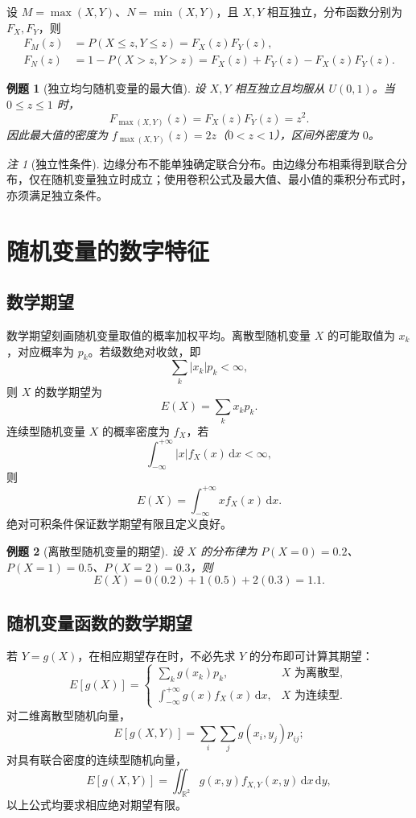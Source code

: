 \documentclass[11pt,a4paper,fontset=fandol]{ctexart}
\newtheorem{example}{例题}[section]
\theoremstyle{remark}
\newtheorem{remark}{注}[section]
\begin{document}
设 $M=\max(X,Y)$、$N=\min(X,Y)$，且 $X,Y$ 相互独立，分布函数分别为 $F_X,F_Y$，则
\[
\begin{aligned}
    F_M(z)
    &=P(X\leq z,Y\leq z)
      =F_X(z)F_Y(z),\\
    F_N(z)
    &=1-P(X>z,Y>z)
      =F_X(z)+F_Y(z)-F_X(z)F_Y(z).
\end{aligned}
\]

\begin{example}[独立均匀随机变量的最大值]
设 $X,Y$ 相互独立且均服从 $U(0,1)$。当 $0\leq z\leq1$ 时，
\[
    F_{\max(X,Y)}(z)=F_X(z)F_Y(z)=z^2.
\]
因此最大值的密度为 $f_{\max(X,Y)}(z)=2z$（$0<z<1$），区间外密度为 $0$。
\end{example}

\begin{remark}[独立性条件]
边缘分布不能单独确定联合分布。由边缘分布相乘得到联合分布，仅在随机变量独立时成立；使用卷积公式及最大值、最小值的乘积分布式时，亦须满足独立条件。
\end{remark}

\clearpage
\section{随机变量的数字特征}
\subsection{数学期望}
数学期望刻画随机变量取值的概率加权平均。离散型随机变量 $X$ 的可能取值为 $x_k$，对应概率为 $p_k$。若级数绝对收敛，即
\[
    \sum_k |x_k|p_k<\infty,
\]
则 $X$ 的数学期望为
\[
    E(X)=\sum_k x_kp_k.
\]
连续型随机变量 $X$ 的概率密度为 $f_X$，若
\[
    \int_{-\infty}^{+\infty}|x|f_X(x)\,\mathrm{d}x<\infty,
\]
则
\[
    E(X)=\int_{-\infty}^{+\infty}x f_X(x)\,\mathrm{d}x.
\]
绝对可积条件保证数学期望有限且定义良好。

\begin{example}[离散型随机变量的期望]
设 $X$ 的分布律为 $P(X=0)=0.2$、$P(X=1)=0.5$、$P(X=2)=0.3$，则
\[
    E(X)=0(0.2)+1(0.5)+2(0.3)=1.1.
\]
\end{example}

\subsection{随机变量函数的数学期望}
若 $Y=g(X)$，在相应期望存在时，不必先求 $Y$ 的分布即可计算其期望：
\[
    E[g(X)]=
    \begin{cases}
        \displaystyle\sum_k g(x_k)p_k,&X\text{ 为离散型},\\[2mm]
        \displaystyle\int_{-\infty}^{+\infty}g(x)f_X(x)\,\mathrm{d}x,
        &X\text{ 为连续型}.
    \end{cases}
\]
对二维离散型随机向量，
\[
    E[g(X,Y)]=\sum_i\sum_j g(x_i,y_j)p_{ij};
\]
对具有联合密度的连续型随机向量，
\[
    E[g(X,Y)]=\iint_{\mathbb{R}^2}g(x,y)f_{X,Y}(x,y)\,\mathrm{d}x\,\mathrm{d}y,
\]
以上公式均要求相应绝对期望有限。
\end{document}

